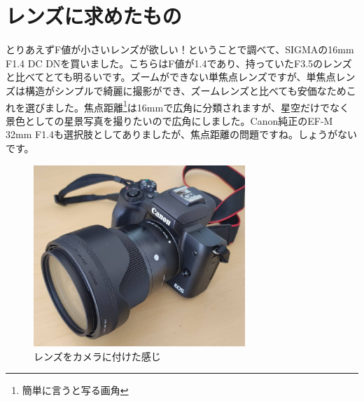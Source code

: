 \documentclass[../../super_nova_2023]{subfiles}
\begin{document}
\section{レンズに求めたもの}
とりあえずF値が小さいレンズが欲しい！ということで調べて、SIGMAの16mm F1.4 DC DNを買いました。こちらはF値が1.4であり、持っていたF3.5のレンズと比べてとても明るいです。ズームができない単焦点レンズですが、単焦点レンズは構造がシンプルで綺麗に撮影ができ、ズームレンズと比べても安価なためこれを選びました。焦点距離\footnote{簡単に言うと写る画角}は16mmで広角に分類されますが、星空だけでなく景色としての星景写真を撮りたいので広角にしました。Canon純正のEF-M 32mm F1.4も選択肢としてありましたが、焦点距離の問題ですね。しょうがないです。
\begin{figure}
	\begin{center}
		\includegraphics[width=8cm]{figures/Maruyama/don.jpg}
		\caption{レンズをカメラに付けた感じ}
	\end{center}
\end{figure}
\end{document}
